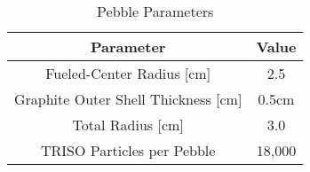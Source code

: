 \begin{table}[h!]
\centering
\begin{tabular}{|| c || c |}
\hline
Parameter & Value \\
\hline \hline
Fueled-Center Radius [cm] & 2.5 \\
Graphite Outer Shell Thickness [cm] & 0.5cm \\
Total Radius [cm] & 3.0 \\
TRISO Particles per Pebble & 18,000 \\
\hline
\end{tabular}
\caption{Pebble Parameters}
\label{table:params2}
\end{table}